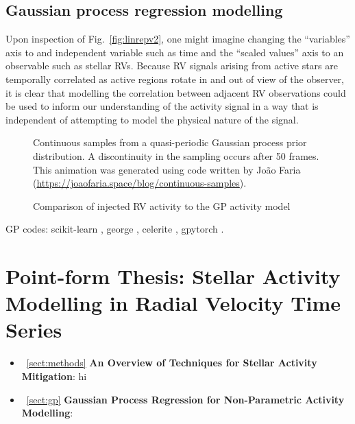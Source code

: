 \subsection{Gaussian process regression modelling} \label{sect:regression}
Upon inspection of Fig.~\ref{fig:linrepv2}, one might imagine changing the ``variables''
axis to and independent variable such as time and the ``scaled values'' axis to an
observable such as stellar RVs. Because RV signals arising from active stars are temporally
correlated as active regions rotate in and out of view of the observer, it is clear that
modelling the correlation between adjacent RV observations could be used to inform
our understanding of the activity signal in a way that is independent of attempting to
model the physical nature of the signal. \\





\begin{figure}
  \centering
  \caption[Samples from a quasi-periodic Gaussian process prior distribution.]
          {Continuous samples from a quasi-periodic Gaussian process prior distribution.
            A discontinuity in the sampling occurs after 50 frames. This animation was
            generated using code written by Jo\~ao
            Faria (\url{https://joaofaria.space/blog/continuous-samples}).}
  \label{fig:gpsamples}
\end{figure}


\begin{figure}
  \centering
  \caption{Comparison of injected RV activity to the GP activity model}
  \label{fig:GPperformance}
\end{figure}


GP codes:
scikit-learn \citep{sklearn},
george \citep{ambikasaran14,foremanmackey15b},
celerite \citep{foremanmackey17},
gpytorch \citep{gardner18,wang19}.


\section{Point-form Thesis: Stellar Activity Modelling in Radial Velocity
  Time Series}
\begin{itemize}
\renewcommand\labelitemi{--}
\item~\ref{sect:methods} \textbf{An Overview of Techniques for Stellar Activity
Mitigation}: hi \\
\item~\ref{sect:gp} \textbf{Gaussian Process Regression for Non-Parametric
  Activity Modelling}:
\end{itemize}
